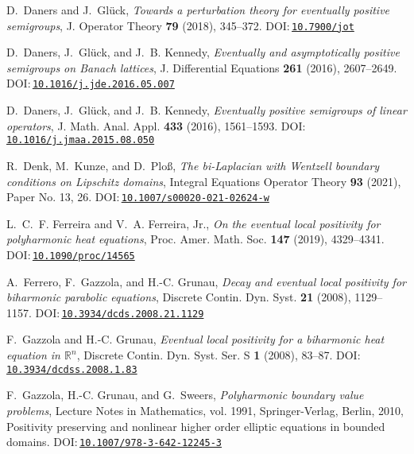 \documentclass[a4paper, reqno]{amsart}
\numberwithin{equation}{section}
\theoremstyle{plain}
\theoremstyle{definition}
\theoremstyle{remark}
\begin{document}
\begin{thebibliography}{10}
D.~Daners and J.~Gl\"{u}ck, \emph{Towards a perturbation theory for eventually
  positive semigroups}, J. Operator Theory \textbf{79} (2018), 345--372.
  DOI:\,\href{https://doi.org/10.7900/jot}{\nolinkurl{10.7900/jot}}

D.~Daners, J.~Gl\"{u}ck, and J.~B. Kennedy, \emph{Eventually and asymptotically
  positive semigroups on {B}anach lattices}, J. Differential Equations
  \textbf{261} (2016), 2607--2649.
  DOI:\,\href{https://doi.org/10.1016/j.jde.2016.05.007}{\nolinkurl{10.1016/j.jde.2016.05.007}}

D.~Daners, J.~Gl\"{u}ck, and J.~B. Kennedy, \emph{Eventually positive
  semigroups of linear operators}, J. Math. Anal. Appl. \textbf{433} (2016),
  1561--1593.
  DOI:\,\href{https://doi.org/10.1016/j.jmaa.2015.08.050}{\nolinkurl{10.1016/j.jmaa.2015.08.050}}

R.~Denk, M.~Kunze, and D.~Plo\ss, \emph{The bi-{L}aplacian with {W}entzell
  boundary conditions on {L}ipschitz domains}, Integral Equations Operator
  Theory \textbf{93} (2021), Paper No. 13, 26.
  DOI:\,\href{https://doi.org/10.1007/s00020-021-02624-w}{\nolinkurl{10.1007/s00020-021-02624-w}}

L.~C.~F. Ferreira and V.~A. Ferreira, Jr., \emph{On the eventual local
  positivity for polyharmonic heat equations}, Proc. Amer. Math. Soc.
  \textbf{147} (2019), 4329--4341.
  DOI:\,\href{https://doi.org/10.1090/proc/14565}{\nolinkurl{10.1090/proc/14565}}

A.~Ferrero, F.~Gazzola, and H.-C. Grunau, \emph{Decay and eventual local
  positivity for biharmonic parabolic equations}, Discrete Contin. Dyn. Syst.
  \textbf{21} (2008), 1129--1157.
  DOI:\,\href{https://doi.org/10.3934/dcds.2008.21.1129}{\nolinkurl{10.3934/dcds.2008.21.1129}}

F.~Gazzola and H.-C. Grunau, \emph{Eventual local positivity for a biharmonic
  heat equation in {$\mathbb{R}^n$}}, Discrete Contin. Dyn. Syst. Ser. S
  \textbf{1} (2008), 83--87.
  DOI:\,\href{https://doi.org/10.3934/dcdss.2008.1.83}{\nolinkurl{10.3934/dcdss.2008.1.83}}

F.~Gazzola, H.-C. Grunau, and G.~Sweers, \emph{Polyharmonic boundary value
  problems}, Lecture Notes in Mathematics, vol. 1991, Springer-Verlag, Berlin,
  2010, Positivity preserving and nonlinear higher order elliptic equations in
  bounded domains.
  DOI:\,\href{https://doi.org/10.1007/978-3-642-12245-3}{\nolinkurl{10.1007/978-3-642-12245-3}}


\end{thebibliography}
\end{document}
